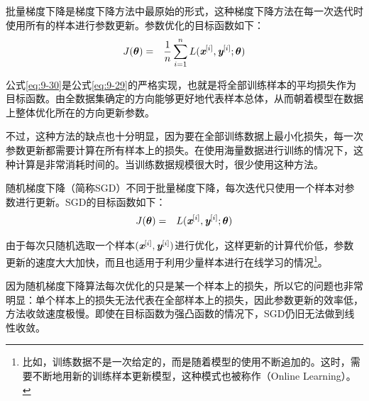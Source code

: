 \vspace{0.5em}

\parinterval 批量梯度下降是梯度下降方法中最原始的形式，这种梯度下降方法在每一次迭代时使用所有的样本进行参数更新。参数优化的目标函数如下：
\begin{eqnarray}
J({\bm \theta})&=&\frac{1}{n}\sum_{i=1}^{n}{L({\textbf{\em x}}^{[i]},{\textbf{\em y}}^{[i]};{\bm \theta})}
\label{eq:9-30}
\end{eqnarray}

\parinterval 公式\eqref{eq:9-30}是公式\eqref{eq:9-29}的严格实现，也就是将全部训练样本的平均损失作为目标函数。由全数据集确定的方向能够更好地代表样本总体，从而朝着模型在数据上整体优化所在的方向更新参数。

\parinterval 不过，这种方法的缺点也十分明显，因为要在全部训练数据上最小化损失，每一次参数更新都需要计算在所有样本上的损失。在使用海量数据进行训练的情况下，这种计算是非常消耗时间的。当训练数据规模很大时，很少使用这种方法。

%

\vspace{0.5em}
\vspace{0.5em}

\parinterval 随机梯度下降（简称SGD）不同于批量梯度下降，每次迭代只使用一个样本对参数进行更新。SGD的目标函数如下：
\begin{eqnarray}
J({\bm \theta})&=&L({\textbf{\em x}}^{[i]},{\textbf{\em y}}^{[i]};{\bm \theta})
\label{eq:9-31}
\end{eqnarray}

\noindent 由于每次只随机选取一个样本$({\textbf{\em x}}^{[i]},{\textbf{\em y}}^{[i]})$进行优化，这样更新的计算代价低，参数更新的速度大大加快，而且也适用于利用少量样本进行在线学习的情况\footnote{比如，训练数据不是一次给定的，而是随着模型的使用不断追加的。这时，需要不断地用新的训练样本更新模型，这种模式也被称作{\scriptsize{}}（Online Learning）。}。

\parinterval 因为随机梯度下降算法每次优化的只是某一个样本上的损失，所以它的问题也非常明显：单个样本上的损失无法代表在全部样本上的损失，因此参数更新的效率低，方法收敛速度极慢。即使在目标函数为强凸函数的情况下，SGD仍旧无法做到线性收敛。

